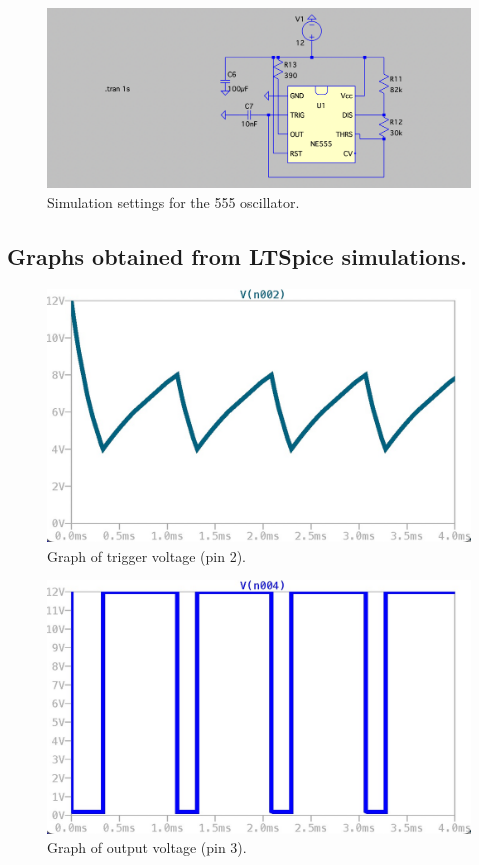 \documentclass[lettersize,journal]{IEEEtran}
\begin{document}
\begin{figure}[H]
    \centering
    \includegraphics[width=\linewidth]{images/anexos/ltspice/week3_sim.png}
    \caption{Simulation settings for the 555 oscillator.}
    \label{fig:ltspice_sim_settings_week3}
\end{figure}

\subsection{Graphs obtained from LTSpice simulations.}

\begin{figure}[H]
    \centering
    \includegraphics[width=\linewidth]{images/ltspice2.jpg}
    \caption{Graph of trigger voltage (pin 2).}
    \label{fig:ltspice_sim_settings_week2}
\end{figure}

\begin{figure}[H]
    \centering
    \includegraphics[width=\linewidth]{images/ltspice3.jpg}
    \caption{Graph of output voltage (pin 3).}
    \label{fig:ltspice_sim_settings_week2}
\end{figure}
\end{document}
